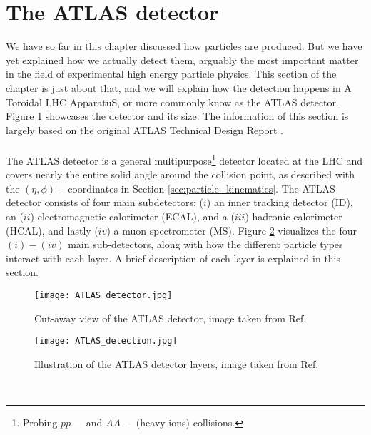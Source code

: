 \documentclass[12pt, a4paper]{book}
\begin{document}
\clearpage
\section{The ATLAS detector}\label{sec:ATLAS}
We have so far in this chapter discussed how particles are produced. But we have yet explained how we actually detect them, arguably the most important matter in the field of experimental high energy particle physics.
This section of the chapter is just about that, and we will explain how the detection happens in A Toroidal LHC ApparatuS, or more commonly know as the ATLAS detector. Figure \ref{fig:ATLAS_detector} showcases 
the detector and its size. The information of this section is largely based on the original ATLAS Technical Design Report \cite{Aad:1129811}.\\
\\The ATLAS detector is a general multipurpose\footnote{Probing $pp-$ and $AA-$ (heavy ions) collisions.} detector located at the LHC and covers nearly the entire solid angle 
around the collision point, as described with the $(\eta,\phi)-$coordinates in Section \ref{sec:particle_kinematics}. The ATLAS detector consists of four main subdetectors; ($i$) an inner tracking detector (ID), 
an ($ii$) electromagnetic calorimeter (ECAL), and a ($iii$) hadronic calorimeter (HCAL), and lastly ($iv$) a muon spectrometer (MS). Figure \ref{fig:ATLAS_layers} visualizes the four $(i)-(iv)$ main sub-detectors, 
along with how the different particle types interact with each layer. A brief description of each layer is explained in this section.
\begin{figure}[!ht]
	\centering
    \texttt{[image: ATLAS\_detector.jpg]}
    \caption[The ATLAS detector]{Cut-away view of the ATLAS detector, image taken from Ref. \cite{Aad:1129811}}\label{fig:ATLAS_detector}
\end{figure}
\begin{figure}[!ht]
	\centering
    \texttt{[image: ATLAS\_detection.jpg]}
    \caption[Illustration of the ATLAS detector layers]{Illustration of the ATLAS detector layers, image taken from Ref. \cite{Pequenao:1505342}}\label{fig:ATLAS_layers}
\end{figure}
\\
\end{document}
